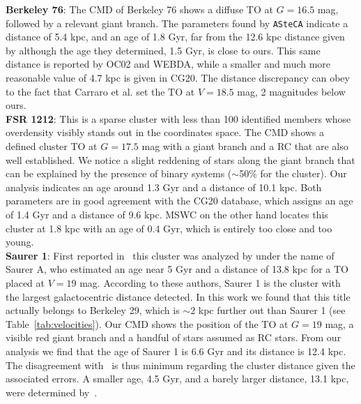 \documentclass[draft]{aa}
\begin{document}
\begin{appendix}
  \noindent \textbf{Berkeley 76}: The CMD of Berkeley 76 shows a diffuse TO at $G=16.5$
  mag, followed by a relevant giant branch. The parameters found by
  \texttt{ASteCA} indicate a distance of 5.4 kpc, and an age of 1.8 Gyr, far
  from the 12.6 kpc distance given
  by \cite{Carraro_2013_Five} although the age they determined, 1.5 Gyr, is
  close to ours. This same distance is reported by OC02 and WEBDA, while a
  smaller and much more reasonable value of 4.7 kpc is given in CG20.
  The distance discrepancy can obey to the fact that Carraro et al. set
  the TO at $V=18.5$ mag, 2 magnitudes below ours.\\

  \noindent \textbf{FSR 1212}: This is a sparse cluster with less than 100 identified 
  members whose overdensity visibly stands out in the coordinates space. The CMD
  shows a defined cluster TO at $G=17.5$ mag with a giant branch and a RC that
  are also well established. We notice a slight reddening of stars along the
  giant branch that can be explained by the presence of binary systems 
  ($\sim$50\% for the cluster).
  Our analysis indicates an age around 1.3 Gyr and a distance of 10.1
  kpc. Both parameters are in good agreement with the CG20 database, which
  assigns an age of 1.4 Gyr and a distance of 9.6 kpc. MSWC on the other hand
  locates this cluster at 1.8 kpc with an age of 0.4 Gyr, which is entirely too
  close and too young.\\

  \noindent \textbf{Saurer 1}: First reported in~\citet[][along with Saurer 3 and Saurer 6]
  {Saurer_1994} this cluster was analyzed by \cite{Carraro_2003} under
  the name of Saurer A, who estimated an age near 5 Gyr and a distance of 13.8
  kpc for a TO placed at $V=19$ mag. According to these authors, Saurer 1 is the
  cluster with the largest galactocentric distance detected. In this work we
  found that this title actually belongs to Berkeley 29, which is $\sim2$
  kpc further out than Saurer 1 (see Table~\ref{tab:velocities}).
  Our CMD shows the position of the TO at $G=19$ mag, a visible red giant
  branch and a handful of stars assumed as RC stars. From our analysis we find
  that the age of Saurer 1 is 6.6 Gyr and its distance is 12.4 kpc. The
  disagreement with~\cite{Carraro_2003} is thus minimum regarding the
  cluster distance given the associated errors. A smaller age, 4.5 Gyr, and
  a barely larger distance, 13.1 kpc, were determined
  by~\cite{Frinchaboy_2006}.\\


\end{appendix}
\end{document}
